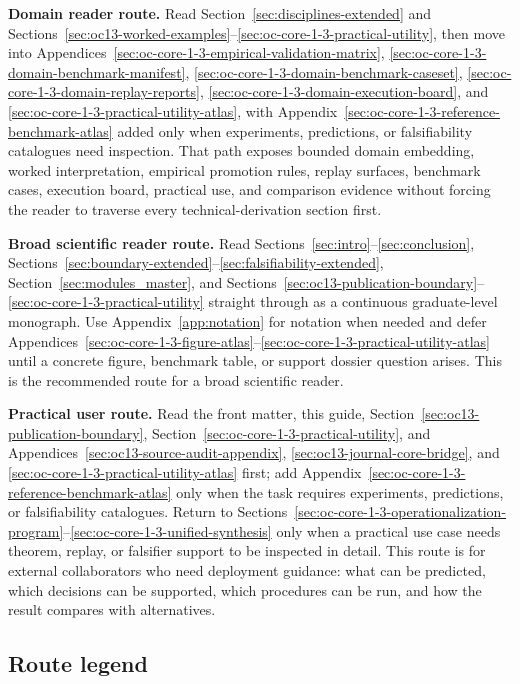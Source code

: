 \textbf{Domain reader route.}
Read Section~\ref{sec:disciplines-extended} and
Sections~\ref{sec:oc13-worked-examples}--\ref{sec:oc-core-1-3-practical-utility},
then move into
Appendices~\ref{sec:oc-core-1-3-empirical-validation-matrix},
\ref{sec:oc-core-1-3-domain-benchmark-manifest},
\ref{sec:oc-core-1-3-domain-benchmark-caseset},
\ref{sec:oc-core-1-3-domain-replay-reports},
\ref{sec:oc-core-1-3-domain-execution-board}, and
\ref{sec:oc-core-1-3-practical-utility-atlas}, with
Appendix~\ref{sec:oc-core-1-3-reference-benchmark-atlas} added only when
experiments, predictions, or falsifiability catalogues need inspection.
That path exposes bounded domain embedding, worked interpretation, empirical
promotion rules, replay surfaces, benchmark cases, execution board, practical
use, and comparison evidence without forcing the reader to traverse every
technical-derivation section first.

\textbf{Broad scientific reader route.}
Read Sections~\ref{sec:intro}--\ref{sec:conclusion},
Sections~\ref{sec:boundary-extended}--\ref{sec:falsifiability-extended},
Section~\ref{sec:modules_master}, and
Sections~\ref{sec:oc13-publication-boundary}--\ref{sec:oc-core-1-3-practical-utility}
straight through as a continuous graduate-level monograph. Use
Appendix~\ref{app:notation} for
notation when needed and defer Appendices~\ref{sec:oc-core-1-3-figure-atlas}--\ref{sec:oc-core-1-3-practical-utility-atlas} until a concrete figure,
benchmark table, or support dossier question arises. This is the recommended
route for a broad scientific reader.

\textbf{Practical user route.}
Read the front matter, this guide,
Section~\ref{sec:oc13-publication-boundary},
Section~\ref{sec:oc-core-1-3-practical-utility}, and
Appendices~\ref{sec:oc13-source-audit-appendix},
\ref{sec:oc13-journal-core-bridge}, and
\ref{sec:oc-core-1-3-practical-utility-atlas} first; add
Appendix~\ref{sec:oc-core-1-3-reference-benchmark-atlas} only when the task
requires experiments, predictions, or falsifiability catalogues. Return
to Sections~\ref{sec:oc-core-1-3-operationalization-program}--\ref{sec:oc-core-1-3-unified-synthesis}
only when a practical use case needs theorem, replay, or falsifier support to
be inspected in detail. This route is for external collaborators who need
deployment guidance: what can be predicted, which decisions can be supported,
which procedures can be run, and how the result compares with alternatives.

\subsection{Route legend}

